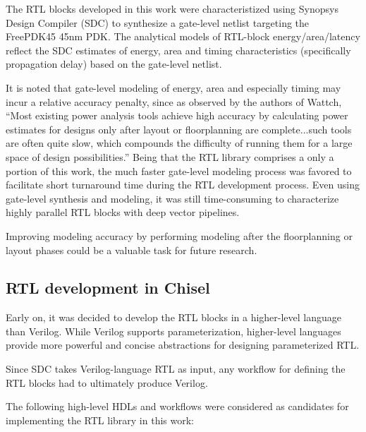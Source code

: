 The RTL blocks developed in this work were characteristized using Synopsys Design Compiler (SDC) to synthesize a gate-level netlist targeting the FreePDK45\cite{freepdk} 45nm PDK. The analytical models of RTL-block energy/area/latency reflect the SDC estimates of energy, area and timing characteristics (specifically propagation delay) based on the gate-level netlist.

It is noted that gate-level modeling of energy, area and especially timing may incur a relative accuracy penalty, since as observed by the authors of Wattch\cite{wattch}, ``Most existing power analysis tools achieve high accuracy by calculating power estimates for designs only after layout or floorplanning are complete...such tools are often quite slow, which compounds the difficulty of running them for a large space of design possibilities.'' Being that the RTL library comprises a only a portion of this work, the much faster gate-level modeling process was favored to facilitate short turnaround time during the RTL development process. Even using gate-level synthesis and modeling, it was still time-consuming to characterize highly parallel RTL blocks with deep vector pipelines. 

Improving modeling accuracy by performing modeling after the floorplanning or layout phases could be a valuable task for future research.

\subsection{RTL development in Chisel}

Early on, it was decided to develop the RTL blocks in a higher-level language than Verilog. While Verilog supports parameterization, higher-level languages provide more powerful and concise abstractions for designing parameterized RTL. 

Since SDC takes Verilog-language RTL as input, any workflow for defining the RTL blocks had to ultimately produce Verilog.

The following high-level HDLs and workflows were considered as candidates for implementing the RTL library in this work:

